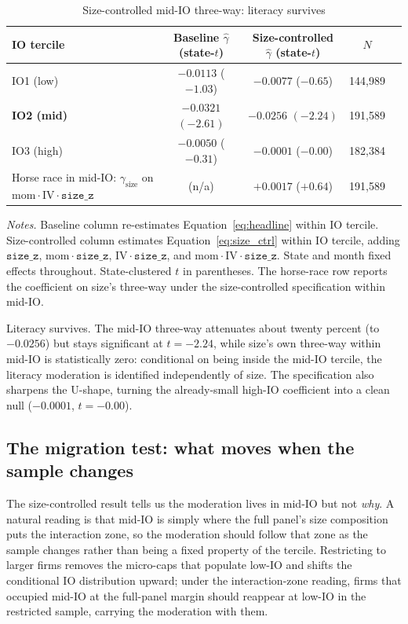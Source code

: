 \begin{table}[t]
\centering
\caption{Size-controlled mid-IO three-way: literacy survives}
\label{tab:size_ctrl}
\footnotesize
\begin{minipage}{\textwidth}
\centering
\begin{tabular}{lcccc}
\toprule
IO tercile & Baseline $\hat\gamma$ (state-$t$) & Size-controlled $\hat\gamma$ (state-$t$) & $N$ \\
\midrule
IO1 (low)  & $-0.0113$ ($-1.03$) & $-0.0077$ ($-0.65$) & 144,989 \\
\textbf{IO2 (mid)} & $\mathbf{-0.0321}$ $(\mathbf{-2.61})$ & $\mathbf{-0.0256}$ $(\mathbf{-2.24})$ & 191,589 \\
IO3 (high) & $-0.0050$ ($-0.31$) & $-0.0001$ ($-0.00$) & 182,384 \\
\midrule
Horse race in mid-IO: $\gamma_{\text{size}}$ on $\mathrm{mom}\cdot\mathrm{IV}\cdot\mathtt{size\_z}$ & (n/a) & $+0.0017$ ($+0.64$) & 191,589 \\
\bottomrule
\end{tabular}
\end{minipage}

\medskip
{\footnotesize\textit{Notes.} Baseline column re-estimates Equation~\eqref{eq:headline} within IO tercile. Size-controlled column estimates Equation~\eqref{eq:size_ctrl} within IO tercile, adding $\mathtt{size\_z}$, $\mathrm{mom}\cdot\mathtt{size\_z}$, $\mathrm{IV}\cdot\mathtt{size\_z}$, and $\mathrm{mom}\cdot\mathrm{IV}\cdot\mathtt{size\_z}$. State and month fixed effects throughout. State-clustered $t$ in parentheses. The horse-race row reports the coefficient on size's three-way under the size-controlled specification within mid-IO.}
\end{table}

Literacy survives. The mid-IO three-way attenuates about twenty percent (to $-0.0256$) but stays significant at $t = -2.24$, while size's own three-way within mid-IO is statistically zero: conditional on being inside the mid-IO tercile, the literacy moderation is identified independently of size. The specification also sharpens the U-shape, turning the already-small high-IO coefficient into a clean null ($-0.0001$, $t = -0.00$).

\subsection{The migration test: what moves when the sample changes}
\label{sec:migration}

The size-controlled result tells us the moderation lives in mid-IO but not \emph{why}. A natural reading is that mid-IO is simply where the full panel's size composition puts the interaction zone, so the moderation should follow that zone as the sample changes rather than being a fixed property of the tercile. Restricting to larger firms removes the micro-caps that populate low-IO and shifts the conditional IO distribution upward; under the interaction-zone reading, firms that occupied mid-IO at the full-panel margin should reappear at low-IO in the restricted sample, carrying the moderation with them.

